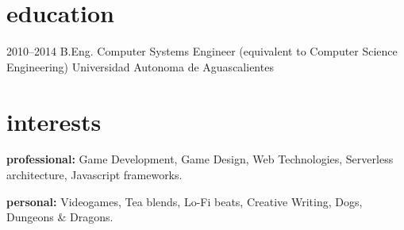 \documentclass[]{cv-style}          %
\begin{document}

\section{education}

\begin{entrylist}
\entry
{2010--2014}
{B.Eng. {\normalfont Computer Systems Engineer (equivalent to Computer Science Engineering) }}
{Universidad Autonoma de Aguascalientes}
{\vspace{-0.3cm}}

\end{entrylist}




\section{interests}
  \vspace{-0.2cm}

\textbf{professional:} {Game Development, Game Design, Web Technologies, Serverless architecture, Javascript frameworks.} 

\textbf{personal:} {Videogames, Tea blends, Lo-Fi beats, Creative Writing, Dogs, Dungeons \& Dragons.}

\end{document}
